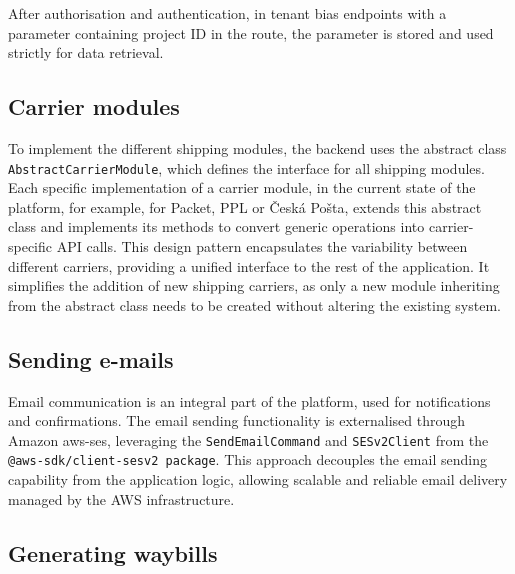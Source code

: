 After authorisation and authentication, in tenant bias endpoints with a parameter containing project ID in the route, the parameter is stored and used strictly for data retrieval.

\subsection{Carrier modules}
To implement the different shipping modules, the backend uses the abstract class \texttt{AbstractCarrierModule}, which defines the interface for all shipping modules.
Each specific implementation of a carrier module, in the current state of the platform, for example, for Packet, PPL or Česká Pošta, extends this abstract class and implements its methods to convert generic operations into carrier-specific API calls. 
This design pattern encapsulates the variability between different carriers, providing a unified interface to the rest of the application. 
It simplifies the addition of new shipping carriers, as only a new module inheriting from the abstract class needs to be created without altering the existing system.

\subsection{Sending e-mails}
Email communication is an integral part of the platform, used for notifications and confirmations. 
The email sending functionality is externalised through Amazon \gls{aws-ses}, leveraging the \texttt{SendEmailCommand} and \texttt{SESv2Client} from the \texttt{@aws-sdk/client-sesv2 package}. This approach decouples the email sending capability from the application logic, allowing scalable and reliable email delivery managed by the AWS infrastructure.

\subsection{Generating waybills}

